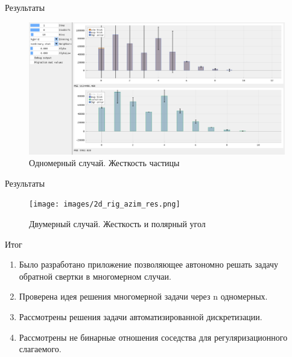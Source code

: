 \documentclass[fullscreen=true,russian,compress,%
	hyperref={unicode,bookmarks=false}]{presentation}
\begin{document}
\begin{frame}{Результаты}
   \begin{figure}[h!]
      \centering
      \includegraphics[width=\linewidth]{images/1d_rig_res.png}
      \caption{Одномерный случай. Жесткость частицы}
   \end{figure}
   
\end{frame}


\begin{frame}{Результаты}
   \begin{figure}[h!]
      \centering
      \texttt{[image: images/2d\_rig\_azim\_res.png]}
      \caption{Двумерный случай. Жесткость и полярный угол}
   \end{figure}
\end{frame}

\begin{frame}{Итог}
   \begin{enumerate}
      \item Было разработано приложение позволяющее автономно решать задачу обратной свертки в многомерном случаи.
      \item Проверена идея решения многомерной задачи через n одномерных.
      \item Рассмотрены решения задачи автоматизированной дискретизации.
      \item Рассмотрены не бинарные отношения соседства для регуляризационного слагаемого.
   \end{enumerate}
\end{frame}
\end{document}
